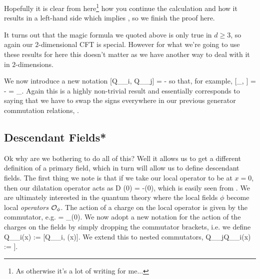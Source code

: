     Hopefully it is clear from here\footnote{As otherwise it's a lot of writing for me...} how you continue the calculation and how it results in a left-hand side which implies , so we finish the proof here.
\eq 

\br 
    It turns out that the magic formula we quoted above is only true in $d\geq 3$, so again our $2$-dimensional CFT is special. However for what we're going to use these results for here this doesn't matter as we have another way to deal with it in $2$-dimensions.
\er 

We now introduce a new notation 
\be
\label{eqn:CommutatorOfChargesRelationNew}
    [Q_{\xi_i}, Q_{\xi_j}] = - \widetilde{[\xi_i, \xi_j]}
\ee 
so that, for example, 
\be 
\label{eqn:CommutatorKDCharges}
    [_{\mu}, ] = - \widetilde{[K_{\mu}, D]} = _{\mu}. 
\ee 
Again this is a highly non-trivial result and essentially corresponds to saying that we have to swap the signs everywhere in our previous generator commutation relations, . 


\subsection{Descendant Fields*}
\label{sec:DescendantFields}

Ok why are we bothering to do all of this? Well it allows us to get a different definition of a primary field, which in turn will allow us to define descendant fields. The first thing we note is that if we take our local operator to be at $x=0$, then our dilatation operator acts as 
\bse 
    D \phi(0) = -\Delta \phi(0),
\ese 
which is easily seen from . We are ultimately interested in the quantum theory where the local fields $\phi$ become local \textit{operators} $\mathcal{O}_{\phi}$. The action of a charge on the local operator is given by the commutator, e.g.
 = \Delta \cO_{\phi}(0).
\ese 
We now adopt a new notation for the action of the charges on the fields by simply dropping the commutator brackets, i.e. we define
\bse 
    Q_{\xi_i}\cO(x) := [Q_{\xi_i}, \cO(x)].
\ese 
We extend this to nested commutators, 
\bse 
    Q_{\xi_j}Q_{\xi_i}\cO(x) := \big[Q_{\xi_j} , [Q_{\xi_i}, \cO(x)]\big].
\ese 

